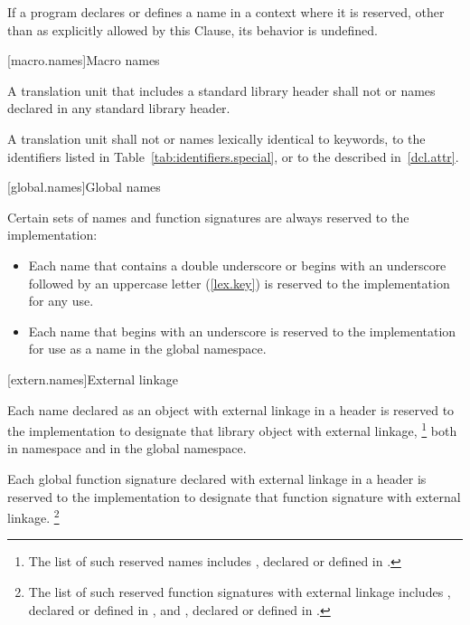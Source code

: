 \pnum
If a program declares or defines a name in a context where it is
reserved, other than as explicitly allowed by this Clause, its behavior is
undefined.%

[macro.names]{Macro names}

\pnum
{}%
%
A translation unit that includes a standard library header shall not
 or  names declared in any standard
library header.

\pnum
{}%
A translation unit shall not  or 
names lexically identical to keywords, to the identifiers listed in
Table~\ref{tab:identifiers.special}, or to the  described
in~\ref{dcl.attr}.

[global.names]{Global names}

\pnum
Certain sets of names and function signatures are always reserved to the implementation:

\begin{itemize}
\item
Each name that contains a double underscore
\tcode{\unun}
%
or begins with an underscore followed by
an uppercase letter
%
(\ref{lex.key}) is reserved to the implementation for any use.
\item
Each name that begins with an underscore is
%
reserved to the implementation for use as a name in the global namespace.%
\end{itemize}

[extern.names]{External linkage}

\pnum
Each name declared as an object with external linkage
%
in a header is reserved to the implementation to designate that library
object with external linkage,%
\footnote{The list of such reserved names includes
,
declared or defined in
%
%
.}
both in namespace
and in the global namespace.

\pnum
Each
%
global function signature declared with
%
external linkage in a header is reserved to the
implementation to designate that function signature with
%
external linkage.
\footnote{The list of such reserved function
signatures with external linkage includes
%
,
declared or defined in
%
,
and
%
%
,
declared or defined in
%
.}

